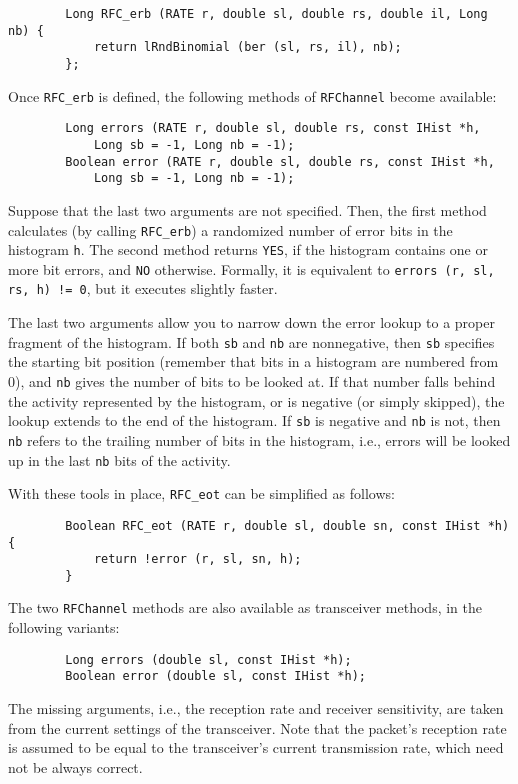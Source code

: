\begin{verbatim}
        Long RFC_erb (RATE r, double sl, double rs, double il, Long nb) {
            return lRndBinomial (ber (sl, rs, il), nb);
        };
\end{verbatim}
\noindent
Once {\tt RFC\_erb} is defined, the following methods of {\tt RFChannel} become
available:

\begin{verbatim}
        Long errors (RATE r, double sl, double rs, const IHist *h,
            Long sb = -1, Long nb = -1);
        Boolean error (RATE r, double sl, double rs, const IHist *h,
            Long sb = -1, Long nb = -1);
\end{verbatim}
\noindent
Suppose that the last two arguments are not specified.
Then, the first method calculates (by calling {\tt RFC\_erb})
a randomized number of error bits in the histogram {\tt h}.
The second method returns {\tt YES}, if the histogram contains one or more
bit errors, and {\tt NO} otherwise.
Formally, it is equivalent to {\tt errors (r, sl, rs, h) != 0}, but it
executes slightly faster.

The last two arguments allow you to narrow down the error lookup to a
proper fragment of the histogram.
If both {\tt sb} and {\tt nb} are nonnegative, then {\tt sb} specifies
the starting bit position (remember that bits in a histogram
are numbered from 0), and {\tt nb} gives the number of bits to be looked at.
If that number falls behind the activity represented by the histogram, or
is negative (or simply skipped), the lookup extends to the end of the
histogram.
If {\tt sb} is negative and {\tt nb} is not, then {\tt nb} refers to the
trailing number of bits in the histogram, i.e., errors will be looked up in
the last {\tt nb} bits of the activity.

With these tools in place, {\tt RFC\_eot} can be simplified as follows:
\begin{verbatim}
        Boolean RFC_eot (RATE r, double sl, double sn, const IHist *h) {
            return !error (r, sl, sn, h);
        }
\end{verbatim}

The two {\tt RFChannel} methods are also available as transceiver
methods, in the following variants:
\begin{verbatim}
        Long errors (double sl, const IHist *h);
        Boolean error (double sl, const IHist *h);
\end{verbatim}
\noindent
The missing arguments, i.e., the reception rate and receiver sensitivity,
are taken from the current settings of the transceiver.
Note that the packet's 
reception rate is assumed to be equal to the transceiver's current
transmission rate, which need not be always correct.

